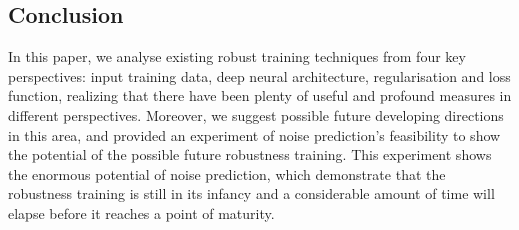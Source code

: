 \documentclass{article}
\begin{document}
\subsection{Conclusion}

In this paper, we analyse existing robust training techniques from four key perspectives: input training data, deep neural architecture, regularisation and loss function, realizing that there have been plenty of useful and profound measures in different perspectives. Moreover, we suggest possible future developing directions in this area, and provided an experiment of noise prediction's feasibility to show the potential of the possible future robustness training. This experiment shows the enormous potential of noise prediction, which demonstrate that the robustness training is still in its infancy and a considerable amount of time will elapse before it reaches a point of maturity.





\end{document}
